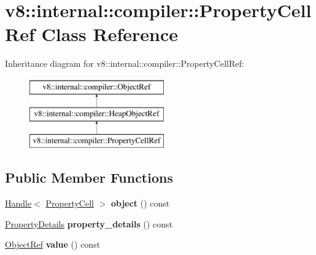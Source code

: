 \hypertarget{classv8_1_1internal_1_1compiler_1_1PropertyCellRef}{}\section{v8\+:\+:internal\+:\+:compiler\+:\+:Property\+Cell\+Ref Class Reference}
\label{classv8_1_1internal_1_1compiler_1_1PropertyCellRef}
Inheritance diagram for v8\+:\+:internal\+:\+:compiler\+:\+:Property\+Cell\+Ref\+:\begin{figure}[H]
\begin{center}
\leavevmode
\includegraphics[height=3.000000cm]{classv8_1_1internal_1_1compiler_1_1PropertyCellRef}
\end{center}
\end{figure}
\subsection*{Public Member Functions}
\begin{DoxyCompactItemize}
\item 
\mbox{\label{classv8_1_1internal_1_1compiler_1_1PropertyCellRef_a2237274faec84e660c411ecc3930cd1d}} 
\mbox{\hyperlink{classv8_1_1internal_1_1Handle}{Handle}}$<$ \mbox{\hyperlink{classv8_1_1internal_1_1PropertyCell}{Property\+Cell}} $>$ {\bfseries object} () const
\item 
\mbox{\label{classv8_1_1internal_1_1compiler_1_1PropertyCellRef_a3da641dc4b9b74ab47d3c2215ed783f4}} 
\mbox{\hyperlink{classv8_1_1internal_1_1PropertyDetails}{Property\+Details}} {\bfseries property\+\_\+details} () const
\item 
\mbox{\label{classv8_1_1internal_1_1compiler_1_1PropertyCellRef_a11f029ed31e939e1523413b977087b89}} 
\mbox{\hyperlink{classv8_1_1internal_1_1compiler_1_1ObjectRef}{Object\+Ref}} {\bfseries value} () const
\end{DoxyCompactItemize}
